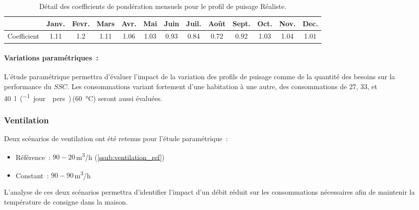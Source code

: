 \begin{table}
\centering
\begin{tabular}{l*{12}{c}}
    \toprule
                & Janv. & Fevr. & Mars & Avr. & Mai & Juin & Juil. & Août & Sept. & Oct. & Nov. & Dec. \\
    \midrule
    Coefficient & \num{1.11}   & \num{1.2}   & \num{1.11}  & \num{1.06}  & \num{1.03}  & \num{0.93}   & \num{0.84}    & \num{0.72}   & \num{0.92}    & \num{1.03}  & \num{1.04}  & \num{1.01}  \\
    \bottomrule
\end{tabular}
\caption{Détail des coefficients de pondération mensuels pour le profil de
         puisage Réaliste.}
         \label{tab:coef_mois}
\end{table}

\paragraph{Variations paramétriques~:} %
\label{par:variations_parametriques}
L’étude paramétrique permettra d’évaluer l’impact de la variation des profils de puisage
comme de la quantité des besoins sur la performance du $SSC$. Les consommations variant
fortement d’une habitation à une autre, des consommations de 27, 33, et
\SI{40}{\litre\per(jour \period  pers)}\,(\SI{60}{\celsius}) seront aussi évaluées.


\subsubsection{Ventilation} %
\label{ssub:ventilation}
Deux scénarios de ventilation ont été retenus pour l’étude paramétrique~:
\begin{itemize}
    \item Référence~: $90-20$\,\si[per-mode=symbol]{\meter\cubed\per\hour} (\ref{ssub:ventilation_ref})
    \item Constant~: $90-90$\,\si[per-mode=symbol]{\meter\cubed\per\hour}
\end{itemize}
L’analyse de ces deux scénarios permettra d’identifier l’impact d’un débit réduit sur
les consommations nécessaires afin de maintenir la température de consigne dans la
maison.


